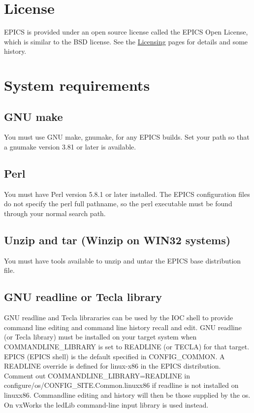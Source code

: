 \documentclass[11pt
  , a4paper
  , article
  , oneside
]{memoir}
\begin{document}
\section{License}
EPICS is provided under an open source license called the EPICS Open License, which is similar to the BSD license. See the \href{http://www.aps.anl.gov/epics/license/index.php}{Licensing} pages for details and some history.
\section{System requirements}
\subsection{GNU make}
You must use GNU make, gnumake, for any EPICS builds. Set your path so that a gnumake version 3.81 or later is available.
\subsection{Perl}
You must have Perl version 5.8.1 or later installed. The EPICS configuration files do not specify the perl full pathname, so the perl executable must be found through your normal search path.
\subsection{Unzip and tar (Winzip on WIN32 systems)}
You must have tools available to unzip and untar the EPICS base distribution file.
\subsection{GNU readline or Tecla library}
GNU readline and Tecla librararies can be used by the IOC shell to provide command line editing and command line history recall and edit. GNU readline (or Tecla library) must be installed on your target system when COMMANDLINE\_LIBRARY is set to READLINE (or TECLA) for that target. EPICS (EPICS shell) is the default specified in CONFIG\_COMMON. A READLINE override is defined for linux-x86 in the EPICS distribution. Comment out COMMANDLINE\_LIBRARY=READLINE in configure/os/CONFIG\_SITE.Common.linux\-x86 if readline is not installed on linux\-x86. Command\-line editing and history will then be those supplied by the os. On vxWorks the ledLib command-line input library is used instead.
\end{document}
